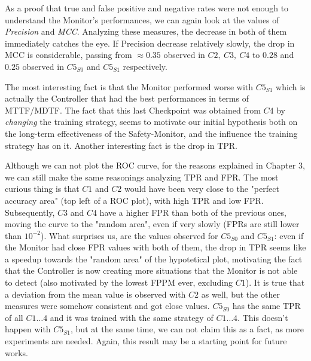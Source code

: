 As a proof that true and false positive and negative rates were not enough to understand the Monitor's performances, we can again look at the values of \textsl{Precision} and \textsl{MCC}. Analyzing these measures, the decrease in both of them immediately catches the eye. If Precision decrease relatively slowly, the drop in MCC is considerable, passing from $\approx 0.35$ observed in $C2,\: C3,\: C4$ to $0.28$ and $0.25$ observed in $C5_{S0}$ and $C5_{S1}$ respectively.

The most interesting fact is that the Monitor performed worse with $C5_{S1}$ which is actually the Controller that had the best performances in terms of MTTF/MDTF. The fact that this last Checkpoint was obtained from $C4$ by \textsl{changing} the training strategy, seems to motivate our initial hypothesis both on the long-term effectiveness of the Safety-Monitor, and the influence the training strategy has on it. 
Another interesting fact is the drop in TPR.

Although we can not plot the ROC curve, for the reasons explained in Chapter 3, we can still make the same reasonings analyzing TPR and FPR. The most curious thing is that $C1$ and $C2$ would have been very close to the "perfect accuracy area" (top left of a ROC plot), with high TPR and low FPR.
Subsequently, $C3$ and $C4$ have a higher FPR than both of the previous ones, moving the curve to the "random area", even if very slowly (FPRs are still lower than $10^{-2}$). What surprises us, are the values observed for $C5_{S0}$ and $C5_{S1}$: even if the Monitor had close FPR values with both of them, the drop in TPR seems like a speedup towards the "random area" of the hypotetical plot, motivating the fact that the Controller is now creating more situations that the Monitor is not able to detect (also motivated by the lowest FPPM ever, excluding $C1$).
It is true that a deviation from the mean value is observed with $C2$ as well, but the other measures were somehow consistent and got close values. $C5_{S0}$ has the same TPR of all $C1\dots 4$ and it was trained with the same strategy of $C1\dots 4$. This doesn't happen with $C5_{S1}$, but at the same time, we can not claim this as a fact, as more experiments are needed. Again, this result may be a starting point for future works.\newline


